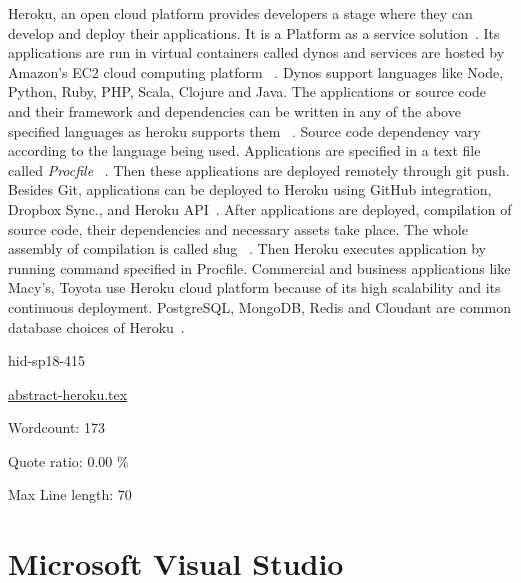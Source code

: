 Heroku, an open cloud platform provides developers a stage where they
can develop and deploy their applications. It is a Platform as a
service solution~\cite{hid-sp18-415-www-heroku}.  Its applications
are run in virtual containers called dynos and services are hosted by
Amazon’s EC2 cloud computing platform
~\cite{hid-sp18-415-wiki-heroku}. Dynos support languages like Node,
Python, Ruby, PHP, Scala, Clojure and Java. The applications or source
code and their framework and dependencies can be written in any of the
above specified languages as heroku supports them
~\cite{hid-sp18-415-how-heroku-works}. Source code dependency vary
according to the language being used. Applications are specified in a
text file called \textit{Procfile}
~\cite{hid-sp18-415-how-heroku-works}. Then these applications are
deployed remotely through git push. Besides Git, applications can be
deployed to Heroku using GitHub integration, Dropbox Sync., and Heroku
API~\cite{hid-sp18-415-how-heroku-works}. After applications are
deployed, compilation of source code, their dependencies and necessary
assets take place. The whole assembly of compilation is called slug
~\cite{hid-sp18-415-how-heroku-works}.  Then Heroku executes
application by running command specified in Procfile.  Commercial and
business applications like Macy’s, Toyota use Heroku cloud platform
because of its high scalability and its continuous
deployment. PostgreSQL, MongoDB, Redis and Cloudant are common
database choices of Heroku~\cite{hid-sp18-415-www-heroku}.


\begin{IU}

hid-sp18-415

\href{https://github.com/cloudmesh-community/hid-sp18-415/blob/master//technology/abstract-heroku.tex}{abstract-heroku.tex}

 

Wordcount: 173


Quote ratio: 0.00 \%
 
Max Line length: 70
\end{IU}

\section{Microsoft Visual Studio}


